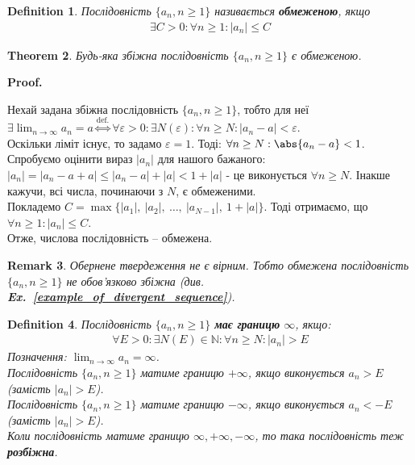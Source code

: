 \documentclass[a4paper, 14pt]{article}
\makeatletter
\def\qed{$\blacksquare$}
\theoremstyle{theoremdd}
\newtheorem{theorem}{Theorem}[subsection]
\theoremstyle{theoremdd}
\newtheorem{definition}[theorem]{Definition}
\theoremstyle{theoremdd}
\theoremstyle{theoremdd}
\theoremstyle{theoremdd}
\theoremstyle{theoremdd}
\newtheorem{remark}[theorem]{Remark}
\theoremstyle{theoremdd}
\theoremstyle{theoremdd}
\renewenvironment{proof}[1][Proof.\\]{\par
\pushQED{\hfill \qed}%
\normalfont \topsep6\p@\@plus6\p@\relax
\trivlist
\item\relax
{\bfseries
#1\@addpunct{.}}\hspace\labelsep\ignorespaces
}{%
\popQED\endtrivlist\@endpefalse
}
\newcommand\exref[1]{\textbf{Ex.~\ref{#1}}}
\makeatother
\begin{document}
	\begin{definition}
	Послідовність $\{a_n, n \geq 1\}$ називається \textbf{обмеженою}, якщо
	\begin{align*}
	\exists C>0: \forall n \geq 1: |a_n|\leq C
	\end{align*}
	\end{definition}
	
	\begin{theorem}
	Будь-яка збіжна послідовність $\{a_n, n \geq 1\}$ є обмеженою.
	\end{theorem}
	
	\begin{proof}
	Нехай задана збіжна послідовність $\{a_n, n \geq 1\}$, тобто для неї\\ $\displaystyle \exists \lim_{n \to \infty} a_n = a \overset{\textrm{def.}}{\iff}\forall \varepsilon > 0: \exists N(\varepsilon): \forall n \geq N: |a_n-a| < \varepsilon$.\\
	Оскільки ліміт існує, то задамо $\varepsilon = 1$. Тоді: $\forall n \geq N: \abs{a_n-a}<1$.\\
	Спробуємо оцінити вираз $|a_n|$ для нашого бажаного:\\
	$|a_n| = |a_n - a + a| \leq |a_n-a|+|a| < 1 + |a|$ - це виконується $\forall n \geq N$. Інакше кажучи, всі числа, починаючи з $N$, є обмеженими.\\
	Покладемо $C=\max\{|a_1|, \ |a_2|, \ \ldots, \ |a_{N-1}|, \ 1+|a|\}$. Тоді отримаємо, що $\forall n\geq1: |a_n|\leq C$. \\ 
	Отже, числова послідовність -- обмежена.
	\end{proof}
	
	\begin{remark}
	Обернене твердеження не є вірним. Тобто обмежена послідовність $\{a_n, n \geq 1\}$ не обов'язково збіжна (див. \exref{example_of_divergent_sequence}).
	\end{remark}
	
	\begin{definition}
	Послідовність $\{a_n, n \geq 1\}$ \textbf{має границю} $\infty$, якщо: 			\begin{align*}
	\forall E>0: \exists N(E) \in \mathbb{N}: \forall n \geq N: |a_n|>E
	\end{align*}
	Позначення: $\displaystyle\lim_{n \to \infty} a_n = \infty$.\\
	Послідовність $\{a_n, n \geq 1\}$ матиме границю $+\infty$, якщо виконується $a_n > E$ (замість $|a_n| > E$).\\
	Послідовність $\{a_n, n \geq 1\}$ матиме границю $-\infty$, якщо виконується $a_n < -E$ (замість $|a_n| > E$).\\
	Коли послідовність матиме границю $\infty, +\infty,-\infty$, то така послідовність теж \textbf{розбіжна}.
	\end{definition}
	
\end{document}
